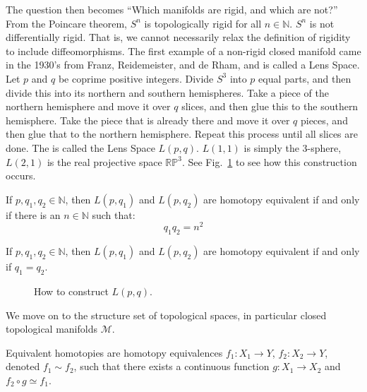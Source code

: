 \documentclass{article}                                                        %
\begin{document}
        The question then becomes
        ``Which manifolds are rigid, and which are not?''
        From the Poincare theorem, $S^{n}$ is topologically
        rigid for all $n\in\mathbb{N}$. $S^{n}$ is not differentially
        rigid. That is, we cannot necessarily relax the definition
        of rigidity to include diffeomorphisms.
        The first example of a non-rigid closed
        manifold came in the 1930's from Franz, Reidemeister,
        and de Rham, and is called a Lens Space.
        Let $p$ and $q$ be coprime positive integers.
        Divide $S^{3}$ into $p$ equal parts, and then divide
        this into its northern and southern hemispheres.
        Take a piece of the northern hemisphere and move
        it over $q$ slices, and then glue this to the
        southern hemisphere. Take the piece that is already
        there and move it over $q$ pieces, and then glue
        that to the northern hemisphere. Repeat this
        process until all slices are done. The is called
        the Lens Space $L(p,q)$. $L(1,1)$ is simply the
        3-sphere, $L(2,1)$ is the real projective space
        $\mathbb{RP}^{3}$.
        See Fig.~\ref{fig:surgery_theory_lens_space_drawing}
        to see how this construction occurs.
        \begin{theorem}
            If $p,q_{1},q_{2}\in\mathbb{N}$, then $L(p,q_{1})$ and
            $L(p,q_{2})$ are homotopy equivalent if and only if there
            is an $n\in\mathbb{N}$ such that:
            \begin{equation}
                q_{1}q_{2}=n^{2}
            \end{equation}
        \end{theorem}
        \begin{theorem}
            If $p,q_{1},q_{2}\in\mathbb{N}$, then $L(p,q_{1})$ and
            $L(p,q_{2})$ are homotopy equivalent if and only if
            $q_{1}=q_{2}$.
        \end{theorem}
        \begin{figure}[H]
            \centering
            \captionsetup{type=figure}
            
            \caption{How to construct $L(p,q)$.}
            \label{fig:surgery_theory_lens_space_drawing}
        \end{figure}
        We move on to the structure set of topological spaces,
        in particular closed topological
        manifolds $\mathcal{M}$.
        \begin{definition}
            Equivalent homotopies are homotopy equivalences
            $f_{1}:X_{1}\rightarrow Y$,
            $f_{2}:X_{2}\rightarrow Y$,
            denoted $f_{1}\sim{f_{2}}$, such that there
            exists a continuous function
            $g:X_{1}\rightarrow{X_{2}}$ and
            $f_{2}\circ{g}\simeq{f_{1}}$.
        \end{definition}
\end{document}
